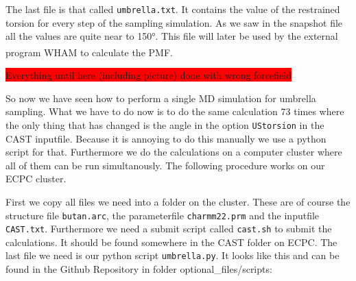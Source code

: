 \documentclass[a4paper,11pt]{scrartcl}
\newcommand{\myCite}[1]{\textsuperscript{\cite{#1}}}
\begin{document}
The last file is that called \texttt{umbrella.txt}. It contains the value of the restrained torsion for every step of the sampling simulation. As we saw in the snapshot file all the values are quite near to 150°. This file will later be used by the external program WHAM\myCite{grossfield_wham_nodate} to calculate the PMF.

\colorbox{red}{Everything until here (including picture) done with wrong forcefield}
\\
\FloatBarrier

So now we have seen how to perform a single MD simulation for umbrella sampling. What we have to do now is to do the same calculation 73 times where the only thing that has changed is the angle in the option \texttt{UStorsion} in the CAST inputfile. Because it is annoying to do this manually we use a python script for that. Furthermore we do the calculations on a computer cluster where all of them can be run simultanously. The following procedure works on our ECPC cluster. 

First we copy all files we need into a folder on the cluster. These are of course the structure file \texttt{butan.arc}, the parameterfile \texttt{charmm22.prm} and the inputfile \texttt{CAST.txt}. Furthermore we need a submit script called \texttt{cast.sh} to submit the calculations. It should be found somewhere in the CAST folder on ECPC. The last file we need is our python script \texttt{umbrella.py}. It looks like this and can be found in the Github Repository in folder \mbox{optional\_files/scripts}:
\end{document}
